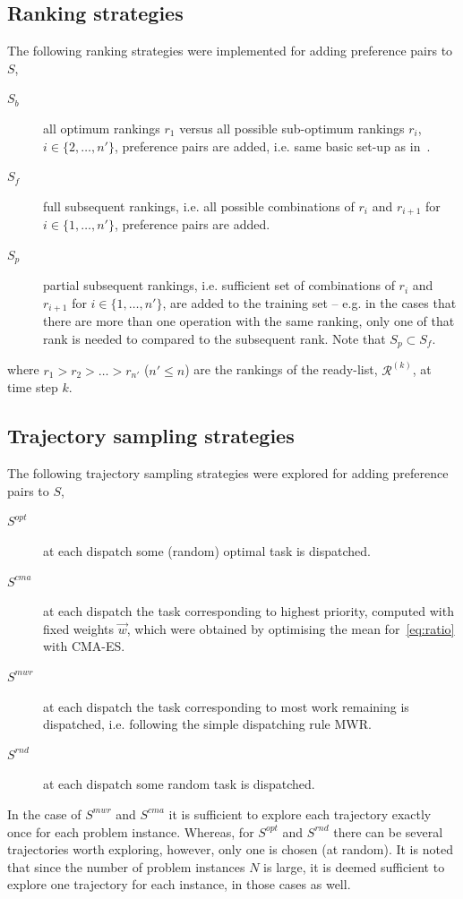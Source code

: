 \documentclass[smallextended]{llncs}
\begin{document}
\subsection{Ranking strategies}
The following ranking strategies were implemented for adding preference pairs to $S$,
\begin{description}
\item[$S_b$] all optimum rankings $r_1$ versus all possible sub-optimum rankings $r_i$, $i\in\{2,\ldots,n'\}$, preference pairs are added, i.e. same basic set-up as in~\cite{InRu11a}. %
\item[$S_f$] full subsequent rankings, i.e. all possible combinations of $r_i$ and $r_{i+1}$ for $i\in\{1,\ldots,n'\}$, preference pairs are added.
\item[$S_p$] partial subsequent rankings, i.e. sufficient set of combinations of $r_i$ and $r_{i+1}$ for $i\in\{1,\ldots,n'\}$, are added to the training set -- e.g. in the cases that there are more than one operation with the same ranking, only one of that rank is needed to compared to the subsequent rank. Note that $S_p\subset S_f$.
\end{description}
where $r_1>r_2>\ldots>r_{n'}$ ($n'\leq n$) are the rankings of the ready-list, $\mathcal{R}^{(k)}$, at time step $k$.

\subsection{Trajectory sampling strategies}
The following trajectory sampling strategies were explored for adding preference pairs to $S$,
\begin{description}
\item[$S^{opt}$] at each dispatch some (random) optimal task is dispatched.
\item[$S^{cma}$] at each dispatch the task corresponding to highest priority, computed with fixed weights $\vec{w}$, which were obtained by optimising the mean for~\eqref{eq:ratio} with CMA-ES. 
\item[$S^{mwr}$] at each dispatch the task corresponding to most work remaining is dispatched, i.e. following the simple dispatching rule MWR.
\item[$S^{rnd}$] at each dispatch some random task is dispatched.
\end{description}
In the case of $S^{mwr}$ and $S^{cma}$ it is sufficient to explore each trajectory exactly once for each problem instance. Whereas, for $S^{opt}$ and $S^{rnd}$ there can be several trajectories worth exploring, however, only one is chosen (at random). It is noted that since the number of problem instances $N$ is large, it is deemed sufficient to explore one trajectory for each instance, in those cases as well.
\end{document}
